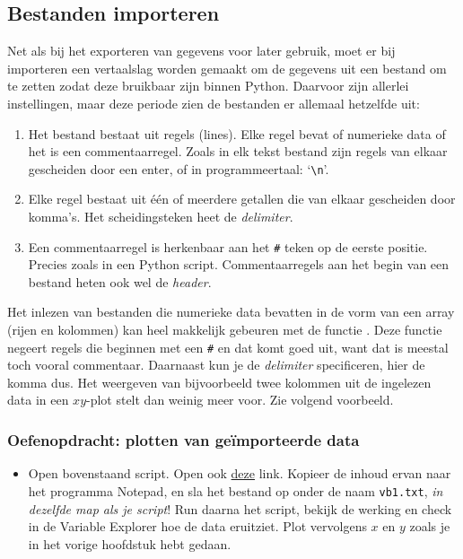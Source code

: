 \documentclass[a4paper,11pt, fleqn]{article}
\begin{document}
\subsection{Bestanden importeren}
Net als bij het exporteren van gegevens voor later gebruik, moet er bij importeren een vertaalslag worden gemaakt om de gegevens uit een bestand om te zetten zodat deze bruikbaar zijn binnen Python. Daarvoor zijn allerlei instellingen, maar deze periode zien de bestanden er allemaal hetzelfde uit:

\begin{enumerate}
\item Het bestand bestaat uit regels (lines). Elke regel bevat of numerieke data of het is een commentaarregel. Zoals in elk tekst bestand zijn regels van elkaar gescheiden door een enter, of in programmeertaal: `\verb,\n,'.
\item Elke regel bestaat uit \'e\'en of meerdere getallen die van elkaar gescheiden door komma's. Het scheidingsteken heet de \textit{delimiter}.
\item Een commentaarregel is herkenbaar aan het \verb,#, teken op de eerste positie. Precies zoals in een Python script. Commentaarregels aan het begin van een bestand heten ook wel de {\it header}.
\end{enumerate}

Het inlezen van bestanden die numerieke data bevatten in de vorm van een array (rijen en kolommen) kan heel makkelijk gebeuren met de  functie . Deze functie negeert regels die beginnen met een \verb,#, en dat komt goed uit, want dat is meestal toch vooral commentaar. Daarnaast kun je de {\it delimiter} specificeren, hier de komma dus. Het weergeven van bijvoorbeeld twee kolommen uit de ingelezen data in een $xy$-plot stelt dan weinig meer voor. Zie volgend voorbeeld.
 

\subsubsection*{Oefenopdracht: plotten van geïmporteerde data}
\begin{itemize}
	\item Open bovenstaand script. Open ook \href{https://github.com/Ichthus-College-IN/Python-x-Meet-je-leefomgeving/blob/main/code-inc/w4/vb1.txt}{deze} link. Kopieer de inhoud ervan naar het programma Notepad, en sla het bestand op onder de naam \verb,vb1.txt,, {\it in dezelfde map als je script}! Run daarna het script, bekijk de werking en check in de Variable Explorer hoe de data eruitziet. Plot vervolgens $x$ en $y$ zoals je in het vorige hoofdstuk hebt gedaan.
\end{itemize}
\end{document}
